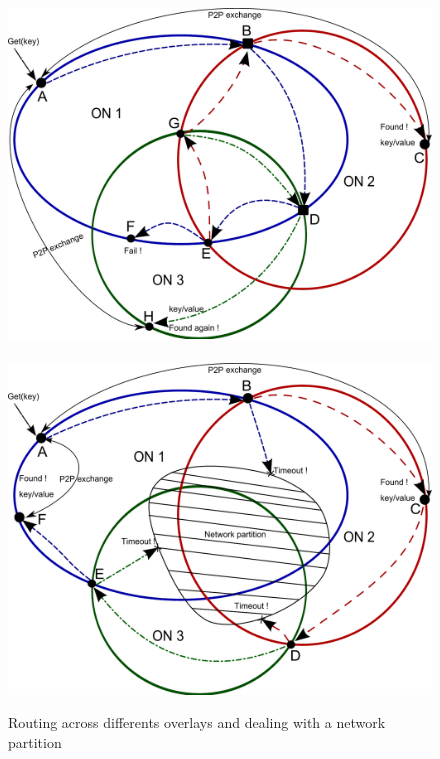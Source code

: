 %
%
\begin{figure}[!t]
  \centering
  \mbox{\includegraphics[width=0.5\columnwidth]{fig/GET_into_other_ON.pdf}\,\,
    \includegraphics[width=0.5\columnwidth]{fig/ON_with_network_partition.pdf}}
  \caption{Routing across differents overlays and dealing with a network partition\label{fig:example}}
\end{figure}
%
%


